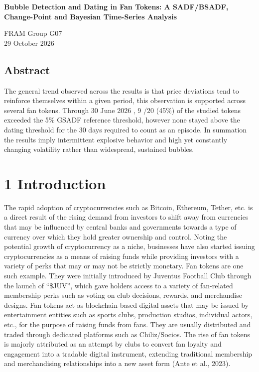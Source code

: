 \documentclass[11pt,a4paper,onecolumn]{article}
\begin{document}
{\LARGE\bfseries Bubble Detection and Dating in Fan Tokens: A SADF/BSADF, Change-Point and Bayesian Time-Series Analysis\par}\vspace{6pt}

{\small FRAM Group G07\\29 October 2026\par}\vspace{6pt}

\subsection{Abstract}

The general trend observed across the results is that price deviations tend to reinforce themselves within a given period, this observation is supported across several fan tokens. Through 30 June 2026 , 9 /20 (45\%) of the studied tokens exceeded the 5\% GSADF reference threshold, however none stayed above the dating threshold for the 30 days required to count as an episode. In summation the results imply intermittent explosive behavior and high yet constantly changing volatility rather than widespread, sustained bubbles.

\section{1 Introduction}

The rapid adoption of cryptocurrencies such as Bitcoin, Ethereum, Tether, etc. is a direct result of the rising demand from investors to shift away from currencies that may be influenced by central banks and governments towards a type of currency over which they hold greater ownership and control. Noting the potential growth of cryptocurrency as a niche, businesses have also started issuing cryptocurrencies as a means of raising funds while providing investors with a variety of perks that may or may not be strictly monetary. Fan tokens are one such example. They were initially introduced by Juventus Football Club through the launch of “\$JUV”, which gave holders access to a variety of fan-related membership perks such as voting on club decisions, rewards, and merchandise designs. Fan tokens act as blockchain-based digital assets that may be issued by entertainment entities such as sports clubs, production studios, individual actors, etc., for the purpose of raising funds from fans. They are usually distributed and traded through dedicated platforms such as Chiliz/Socios. The rise of fan tokens is majorly attributed as an attempt by clubs to convert fan loyalty and engagement into a tradable digital instrument, extending traditional membership and merchandising relationships into a new asset form (Ante et al., 2023).
\end{document}
